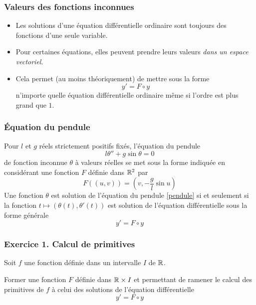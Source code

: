 \begin{frame}
  \frametitle{Valeurs des fonctions inconnues}
\begin{itemize}
  \item Les solutions d'une équation différentielle ordinaire sont toujours des fonctions d'une seule variable.
  \item Pour certaines équations, elles peuvent prendre leurs valeurs \emph{dans un espace vectoriel}.
  \item Cela permet (au moins théoriquement) de mettre sous la forme
\begin{equation*}
  y' = F\circ y
\end{equation*}  
  n'importe quelle équation différentielle ordinaire même si l'ordre est plus grand que $1$.
\end{itemize}
\end{frame}

\begin{frame}
  \frametitle{\'Equation du pendule}
Pour $l$ et $g$ réels strictement positifs fixés, l'équation du pendule
\begin{equation}
  l\theta'' + g \sin \theta = 0
  \label{pendule}
\end{equation}
de fonction inconnue $\theta$ à valeurs réelles se met sous la forme indiquée en considérant une fonction $F$ définie dans $\mathbb{R}^2$ par 
\begin{displaymath}
  F((u,v)) = (v,-\frac{g}{l}\sin u)
\end{displaymath}
Une fonction $\theta$ est solution de l'équation du pendule \eqref{pendule} si et seulement si la fonction $t\mapsto (\theta(t),\theta'(t))$ est solution de l'équation différentielle sous la forme générale
\begin{equation*}
  y' = F\circ y
\end{equation*}  
\end{frame}

\begin{frame}
\frametitle{Exercice 1. Calcul de primitives}
Soit $f$ une fonction définie dans un intervalle $I$ de $\mathbb{R}$.

Former une fonction $F$ définie dans $\mathbb{R}\times I$ et permettant de ramener le calcul des primitives de $f$ à celui des solutions de l'équation différentielle
\begin{equation*}
  y' = F\circ y
\end{equation*}  
\end{frame}

